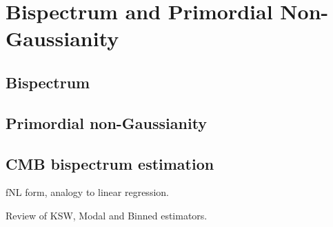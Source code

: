 \chapter{Bispectrum and Primordial Non-Gaussianity}

\ifpdf
    \graphicspath{{Chapter3/Figs/Raster/}{Chapter3/Figs/PDF/}{Chapter3/Figs/}}
\else
    \graphicspath{{Chapter3/Figs/Vector/}{Chapter3/Figs/}}
\fi

\section{Bispectrum}

\section{Primordial non-Gaussianity}

\section{CMB bispectrum estimation}

fNL form, analogy to linear regression.

Review of KSW, Modal and Binned estimators.
